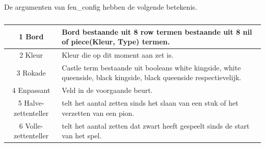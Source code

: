 \documentclass[a4paper,10pt]{article}
\begin{document}
De argumenten van fen\_config hebben de volgende betekenis.
\begin{table}[H]
    \caption{}
    \label{tab:Argumenten}
    \begin{center}
        \begin{tabular}{|c|m{10cm}|}
        \hline
        1 Bord & Bord bestaande uit 8 row termen bestaande uit 8 nil of piece(Kleur, Type) termen.\\
        \hline
        2 Kleur & Kleur die op dit moment aan zet is.\\
        3 Rokade & Castle term bestaande uit booleans white kingside, white queenside, black kingside, black queenside respectievelijk.\\
        \hline
        4 Enpassant &  Veld in de voorgaande beurt.\\
        \hline
        5 Halve-zettenteller & telt het aantal zetten sinds het slaan van een stuk of het verzetten van een pion.\\
        \hline
        6 Volle-zettenteller & telt het aantal zetten dat zwart heeft gespeelt sinds  de start van het spel.\\
        \hline
        \end{tabular}
    \end{center}
\end{table}

   
\end{document}
